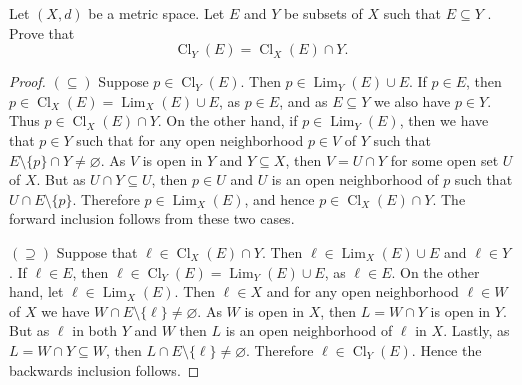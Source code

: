 \documentclass[10pt,reqno]{amsart}
\theoremstyle{definition}
\DeclareMathOperator{\Lim}{Lim}
\DeclareMathOperator{\Cl}{Cl}
\begin{document}
\begin{tcolorbox}[colback=black!5!white,colframe=black!75!black,title= Chapter 4 $\S 1.2$: Exercise 1.10.] Let $(X, d)$ be a metric space. Let $E$ and $Y$ be subsets of $X$ such that $E \subseteq Y$ . Prove
that
\[ \Cl_Y(E) = \Cl_X(E) \cap Y.
\]
\tcblower 
\begin{proof} $(\subseteq)$ Suppose $p \in \Cl_Y(E)$. Then $p \in \Lim_Y(E) \cup E$. If $p \in E$, then $p \in \Cl_X(E) = \Lim_X(E) \cup E$, as $p \in E$, and as $E \subseteq Y$ we also have $p \in Y$. Thus $p \in \Cl_X(E) \cap Y$. On the other hand, if $p \in \Lim_Y(E)$, then we have that $p \in Y$ such that for any open neighborhood $p \in V$ of $Y$ such that $E \setminus \{ p \} \cap Y \neq \varnothing$. As $V$ is open in $Y$ and $Y \subseteq X$, then $V = U \cap Y$ for some open set $U$ of $X$. But as $U \cap Y \subseteq U$, then $p \in U$ and $U$ is an open neighborhood of $p$ such that $U \cap E \setminus \{ p \}$. Therefore $p \in \Lim_X(E)$, and hence $p \in \Cl_X(E) \cap Y$. The forward inclusion follows from these two cases. 

$(\supseteq)$ Suppose that $\ell \in \Cl_X(E) \cap Y$. Then $\ell \in \Lim_X(E) \cup E$ and $\ell \in  Y$. If $\ell \in E$, then $\ell \in \Cl_Y(E) = \Lim_Y(E) \cup E$, as $\ell \in E$. On the other hand, let $\ell \in \Lim_X(E)$. Then $\ell \in X$ and for any open neighborhood $\ell \in W$ of $X$ we have $W \cap E \setminus \{ \ell \} \neq \varnothing$. As $W$ is open in $X$, then $L = W \cap Y$ is open in $Y$. But as $\ell$ in both $Y$ and $W$ then $L$ is an open neighborhood of $\ell $ in $X$. Lastly, as $L = W \cap Y \subseteq W$, then $L \cap E \setminus \{ \ell \} \neq \varnothing$. Therefore $\ell \in \Cl_Y(E)$. Hence the backwards inclusion follows. 
\end{proof}
\end{tcolorbox}
\end{document}
